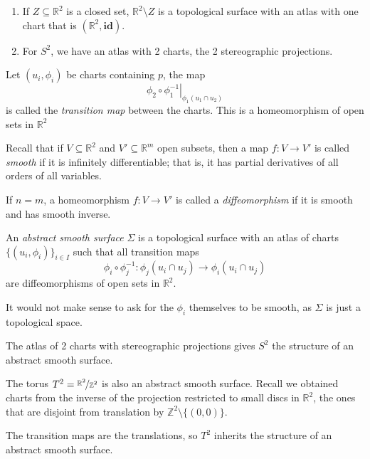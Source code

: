\begin{example}
    \leavevmode
    \begin{enumerate}
        \item If \(Z \subseteq \mathbb{R}^2\) is a closed set, \(\mathbb{R}^2 \setminus Z\) is a topological surface with an atlas with one chart that is \((\mathbb{R}^2,\mathbf{id})\).
        \item For \(S^2\), we have an atlas with 2 charts, the 2 stereographic projections.
    \end{enumerate}
\end{example}
\begin{definition}
    Let \((u_i, \phi_i)\) be charts containing \(p\), the map \[\left.\phi_2 \circ \phi_1^{-1} \right|_{\phi_1 (u_1\cap u_2)}\] is called the \textit{transition map} between the charts. This is a homeomorphism of open sets in \(\mathbb{R}^2\)
\end{definition}
Recall that if \(V \subseteq \mathbb{R}^2\) and \(V' \subseteq \mathbb{R}^m\) open subsets, then a map \(f: V \to V'\) is called \textit{smooth} if it is infinitely differentiable; that is, it has partial derivatives of all orders of all variables.

If \(n = m\), a homeomorphism \(f: V \to V'\) is called a \textit{diffeomorphism} if it is smooth and has smooth inverse.

\begin{definition}
    An \textit{abstract smooth surface} \(\Sigma\) is a topological surface with an atlas of charts \(\{(u_i, \phi_i)\}_{i\in I}\) such that all transition maps
    \[
        \phi_i \circ \phi_j^{-1}: \phi_j(u_i\cap u_j) \to \phi_i(u_i \cap u_j)
    \]
    are diffeomorphisms of open sets in \(\mathbb{R}^2\).
\end{definition}
\begin{note}
    It would not make sense to ask for the \(\phi_i\) themselves to be smooth, as \(\Sigma\) is just a topological space.
\end{note}
\begin{example}
    The atlas of 2 charts with stereographic projections gives \(S^2\) the structure of an abstract smooth surface.
\end{example}
\begin{example}
    The torus \(T^2 = \nicefrac{\mathbb{R}^2}{\mathbb{Z}^2}\) is also an abstract smooth surface. Recall we obtained charts from the inverse of the projection restricted to small discs in \(\mathbb{R}^2\), the ones that are disjoint from translation by \(\mathbb{Z}^2 \setminus \{(0,0)\}\).

    The transition maps are the translations, so \(T^2\) inherits the structure of an abstract smooth surface.
\end{example}